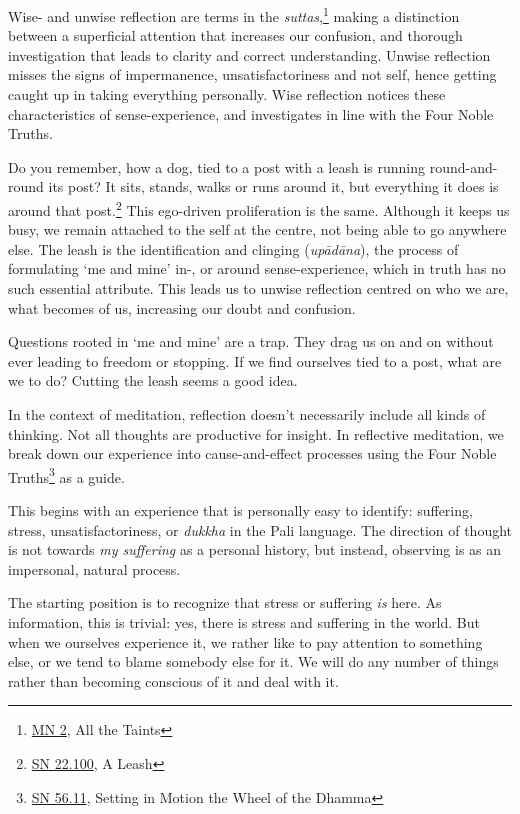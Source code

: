 Wise- and unwise reflection are terms in the \emph{suttas},\footnote{\href{https://suttacentral.net/mn2/en/bodhi}{MN
  2}, All the Taints} making a distinction between a superficial
attention that increases our confusion, and thorough investigation that
leads to clarity and correct understanding. Unwise reflection misses the
signs of impermanence, unsatisfactoriness and not self, hence getting
caught up in taking everything personally. Wise reflection notices these
characteristics of sense-experience, and investigates in line with the
Four Noble Truths.


Do you remember, how a dog, tied to a post with a leash is running
round-and-round its post? It sits, stands, walks or runs around it, but
everything it does is around that post.\footnote{\href{https://suttacentral.net/sn22.100}{SN
  22.100}, A Leash} This ego-driven proliferation is the same. Although
it keeps us busy, we remain attached to the self at the centre, not
being able to go anywhere else. The leash is the identification and
clinging (\emph{upādāna}), the process of formulating `me and mine' in-,
or around sense-experience, which in truth has no such essential
attribute. This leads us to unwise reflection centred on who we are,
what becomes of us, increasing our doubt and confusion.

Questions rooted in `me and mine' are a trap. They drag us on and on
without ever leading to freedom or stopping. If we find ourselves tied
to a post, what are we to do? Cutting the leash seems a good idea.

In the context of meditation, reflection doesn't necessarily include all
kinds of thinking. Not all thoughts are productive for insight. In
reflective meditation, we break down our experience into
cause-and-effect processes using the Four Noble Truths\footnote{\href{https://suttacentral.net/sn56.11}{SN
  56.11}, Setting in Motion the Wheel of the Dhamma} as a guide.

This begins with an experience that is personally easy to identify:
suffering, stress, unsatisfactoriness, or \emph{dukkha} in the Pali
language. The direction of thought is not towards \emph{my suffering} as
a personal history, but instead, observing is as an impersonal, natural
process.


The starting position is to recognize that stress or suffering \emph{is}
here. As information, this is trivial: yes, there is stress and
suffering in the world. But when we ourselves experience it, we rather
like to pay attention to something else, or we tend to blame somebody
else for it. We will do any number of things rather than becoming
conscious of it and deal with it.

